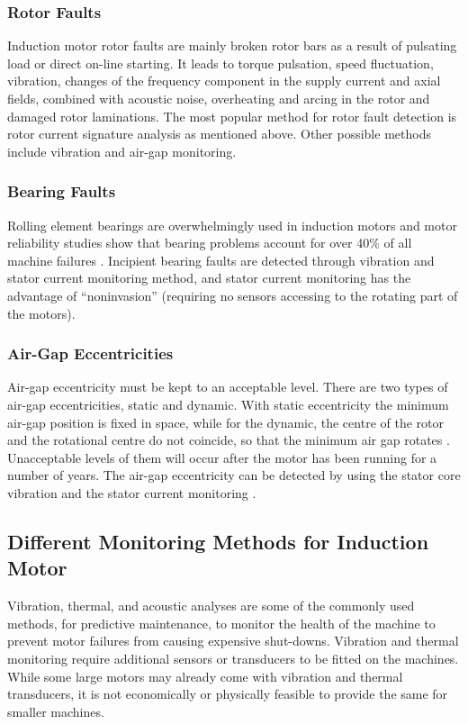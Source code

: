\documentclass[a4paper,11pt]{article}
\begin{document}
\subsubsection*{Rotor Faults} 
Induction motor rotor faults are mainly broken rotor bars as a result of pulsating load or direct on-line starting. It leads to torque pulsation, speed fluctuation, vibration, changes of the frequency component in the supply current and axial fields, combined with acoustic noise, overheating and arcing in the rotor and damaged rotor laminations. The most popular method for rotor fault detection is rotor current signature analysis as mentioned above. Other possible methods include vibration and air-gap monitoring.

\subsubsection*{Bearing Faults}
Rolling element bearings are overwhelmingly used in induction motors and motor reliability studies show that bearing problems account for over 40\% of all machine failures \cite{59}. Incipient bearing faults are detected through vibration and stator current monitoring method, and stator current monitoring has the advantage of ``noninvasion'' (requiring no sensors accessing to the rotating part of the motors).

\subsubsection*{Air-Gap Eccentricities}
Air-gap eccentricity must be kept to an acceptable level. There are two types of air-gap eccentricities, static and dynamic. With static eccentricity the minimum air-gap position is fixed in space, while for the dynamic, the centre of the rotor and the rotational centre do not coincide, so that the minimum air gap rotates \cite{rps6}. Unacceptable levels of them will occur after the motor has been running for a number of years. The air-gap eccentricity can be detected by using the stator core vibration and the stator current monitoring \cite{rps6}. 

\subsection{Different Monitoring Methods for Induction Motor}
Vibration, thermal, and acoustic analyses are some of the commonly used methods, for predictive maintenance, to monitor the health of the machine to prevent motor failures from causing expensive shut-downs. Vibration and thermal monitoring require additional sensors or transducers to be fitted on the machines. While some large motors may already come with vibration and thermal transducers, it is not economically or physically feasible to provide the same for smaller machines.
\end{document}
